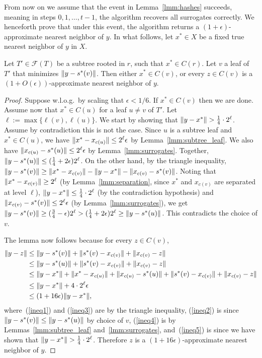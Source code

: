 From now on we assume that the event in Lemma~\ref{lmm:hashes} succeeds, meaning in steps $0,1,\ldots,t-1$, the algorithm recovers all surrogates correctly. We henceforth prove that under this event, the algorithm returns a $(1+\epsilon)$-approximate nearest neighbor of $y$.
In what follows, let $x^*\in X$ be a fixed true nearest neighbor of $y$ in $X$.

\begin{lemma}\label{lmm:annrounds}
Let $T'\in\mathcal F(T)$ be a subtree rooted in $r$, such that $x^*\in C(r)$.
Let $v$ a leaf of $T'$ that minimizes $\lVert y-s^*(v)\rVert$.
Then either $x^*\in C(v)$,
or every $z\in C(v)$ is a $(1+O(\epsilon))$-approximate nearest neighbor of $y$.
\end{lemma}
\begin{proof}
Suppose w.l.o.g.~by scaling that $\epsilon<1/6$.
If $x^*\in C(v)$ then we are done. Assume now that $x^*\in C(u)$ for a leaf $u\neq v$ of $T'$.
Let $\ell:=\max\{\ell(v),\ell(u)\}$. We start by showing that $\lVert y-x^*\rVert>\frac{1}{4}\cdot 2^\ell$. Assume by contradiction this is not the case. Since $u$ is a subtree leaf and $x^*\in C(u)$, we have $\lVert x^*-x_{c(u)}\rVert\leq2^{\ell}\epsilon$ by Lemma~\ref{lmm:subtree_leaf}.
We also have $\lVert x_{c(u)}-s^*(u)\rVert\leq2^{\ell}\epsilon$ by Lemma~\ref{lmm:surrogates}. Together, $\lVert y-s^*(u)\rVert\leq(\frac{1}{4}+2\epsilon)2^\ell$. On the other hand, by the triangle inequality,
$\lVert y-s^*(v)\rVert \geq \lVert x^*-x_{c(v)}\rVert - \lVert y-x^*\rVert - \lVert x_{c(v)}-s^*(v)\rVert$.
Noting that $\lVert x^*-x_{c(v)}\rVert\geq2^\ell$ (by Lemma~\ref{lmm:separation}, since $x^*$ and $x_{c(v)}$ are separated at level $\ell$), $\lVert y-x^*\rVert\leq\frac{1}{4}\cdot 2^\ell$ (by the contradiction hypothesis) and $\lVert x_{c(v)}-s^*(v)\rVert\leq2^\ell\epsilon$ (by Lemma~\ref{lmm:surrogates}), we get $\lVert y-s^*(v)\rVert\geq(\frac{3}{4}-\epsilon)2^\ell>(\frac{1}{4}+2\epsilon)2^\ell\geq\lVert y-s^*(u)\rVert$. This contradicts the choice of $v$.

The lemma now follows because for every $z\in C(v)$,
\begin{align}
\lVert y-z\rVert &\leq \lVert y-s^*(v)\rVert + \lVert s^*(v)-x_{c(v)}\rVert + \lVert x_{c(v)}-z\rVert \label{ineq1} \\
&\leq \lVert y-s^*(u)\rVert + \lVert s^*(v)-x_{c(v)}\rVert + \lVert x_{c(v)}-z\rVert \label{ineq2} \\
&\leq \lVert y-x^*\rVert + \lVert x^*-x_{c(u)}\rVert + \lVert x_{c(u)}-s^*(u)\rVert +\lVert s^*(v)-x_{c(v)}\rVert + \lVert x_{c(v)}-z\rVert \label{ineq3} \\
&\leq \lVert y-x^*\rVert + 4\cdot2^\ell\epsilon \label{ineq4} \\
&\leq (1+16\epsilon)\lVert y-x^*\rVert, \label{ineq5}
\end{align}
where~(\ref{ineq1}) and (\ref{ineq3}) are by the triangle inequality, (\ref{ineq2}) is since $\lVert y-s^*(v)\rVert\leq\lVert y-s^*(u)\rVert$ by choice of $v$, (\ref{ineq4}) is by Lemmas~\ref{lmm:subtree_leaf} and~\ref{lmm:surrogates}, and~(\ref{ineq5}) is since we have shown that $\lVert y-x^*\rVert>\frac{1}{4}\cdot 2^\ell$.
Therefore $z$ is a $(1+16\epsilon)$-approximate nearest neighbor of $y$.
\end{proof}

